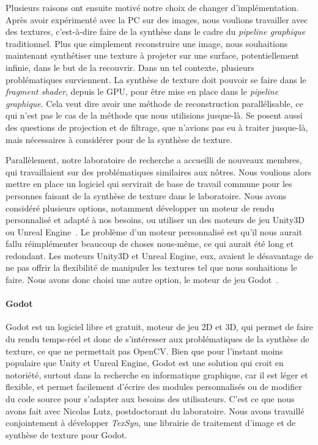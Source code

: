 \bigskip

Plusieurs raisons ont ensuite motivé notre choix de changer d'implémentation. Après avoir expérimenté avec la PC sur des images, nous voulions travailler avec des textures, c'est-à-dire faire de la synthèse dans le cadre du \textit{pipeline graphique} traditionnel. Plus que simplement reconstruire une image, nous souhaitions maintenant synthétiser une texture à projeter sur une surface, potentiellement infinie, dans le but de la recouvrir. Dans un tel contexte, plusieurs problématiques surviennent. La synthèse de texture doit pouvoir se faire dans le \textit{fragment shader}, depuis le GPU, pour être mise en place dans le \textit{pipeline graphique}. Cela veut dire avoir une méthode de reconstruction parallélisable, ce qui n'est pas le cas de la méthode que nous utilisions jusque-là. Se posent aussi des questions de projection et de filtrage, que n'avions pas eu à traiter jusque-là, mais nécessaires à considérer pour de la synthèse de texture.

\bigskip

Parallèlement, notre laboratoire de recherche a accueilli de nouveaux membres, qui travaillaient sur des problématiques similaires aux nôtres. Nous voulions alors mettre en place un logiciel qui servirait de base de travail commune pour les personnes faisant de la synthèse de texture dans le laboratoire. Nous avons considéré plusieurs options, notamment développer un moteur de rendu personnalisé et adapté à nos besoins, ou utiliser un des moteurs de jeu Unity3D~\cite{unity_engine} ou Unreal Engine~\cite{unreal_engine}. Le problème d'un moteur personnalisé est qu'il nous aurait fallu réimplémenter beaucoup de choses nous-même, ce qui aurait été long et redondant. Les moteurs Unity3D et Unreal Engine, eux, avaient le désavantage de ne pas offrir la flexibilité de manipuler les textures tel que nous souhaitions le faire. Nous avons donc choisi une autre option, le moteur de jeu Godot~\cite{godot_game_engine}.

\paragraph{Godot}

Godot est un logiciel libre et gratuit, moteur de jeu 2D et 3D, qui permet de faire du rendu temps-réel et donc de s'intéresser aux problématiques de la synthèse de texture, ce que ne permettait pas OpenCV. Bien que pour l'instant moins populaire que Unity et Unreal Engine, Godot est une solution qui croit en notoriété, surtout dans la recherche en informatique graphique, car il est léger et flexible, et permet facilement d'écrire des modules personnalisés ou de modifier du code source pour s'adapter aux besoins des utilisateurs. C'est ce que nous avons fait avec Nicolas Lutz, postdoctorant du laboratoire. Nous avons travaillé conjointement à développer \textit{TexSyn}, une librairie \cpp de traitement d'image et de synthèse de texture pour Godot.


